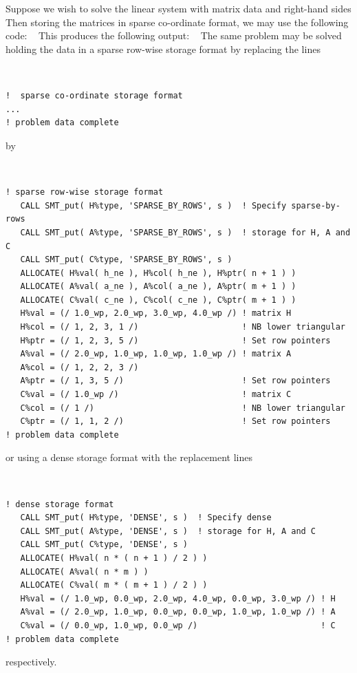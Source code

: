 \documentclass{galahad}
\newcommand{\package}{ssls}
\begin{document}
\galexample
Suppose we wish to solve the linear system  with matrix data
and right-hand sides
Then storing the matrices in sparse co-ordinate format,
we may use the following code:
{\tt \small
\VerbatimInput{\packageexample}
}
\noindent
This produces the following output:
{\tt \small
\VerbatimInput{\packageresults}
}
\noindent
The same problem may be solved holding the data in
a sparse row-wise storage format by replacing the lines
{\tt \small
\begin{verbatim}
!  sparse co-ordinate storage format
...
! problem data complete
\end{verbatim}
}
\noindent
by
{\tt \small
\begin{verbatim}
! sparse row-wise storage format
   CALL SMT_put( H%type, 'SPARSE_BY_ROWS', s )  ! Specify sparse-by-rows
   CALL SMT_put( A%type, 'SPARSE_BY_ROWS', s )  ! storage for H, A and C
   CALL SMT_put( C%type, 'SPARSE_BY_ROWS', s )
   ALLOCATE( H%val( h_ne ), H%col( h_ne ), H%ptr( n + 1 ) )
   ALLOCATE( A%val( a_ne ), A%col( a_ne ), A%ptr( m + 1 ) )
   ALLOCATE( C%val( c_ne ), C%col( c_ne ), C%ptr( m + 1 ) )
   H%val = (/ 1.0_wp, 2.0_wp, 3.0_wp, 4.0_wp /) ! matrix H
   H%col = (/ 1, 2, 3, 1 /)                     ! NB lower triangular
   H%ptr = (/ 1, 2, 3, 5 /)                     ! Set row pointers
   A%val = (/ 2.0_wp, 1.0_wp, 1.0_wp, 1.0_wp /) ! matrix A
   A%col = (/ 1, 2, 2, 3 /)
   A%ptr = (/ 1, 3, 5 /)                        ! Set row pointers
   C%val = (/ 1.0_wp /)                         ! matrix C
   C%col = (/ 1 /)                              ! NB lower triangular
   C%ptr = (/ 1, 1, 2 /)                        ! Set row pointers
! problem data complete
\end{verbatim}
}
\noindent
or using a dense storage format with the replacement lines
{\tt \small
\begin{verbatim}
! dense storage format
   CALL SMT_put( H%type, 'DENSE', s )  ! Specify dense
   CALL SMT_put( A%type, 'DENSE', s )  ! storage for H, A and C
   CALL SMT_put( C%type, 'DENSE', s )
   ALLOCATE( H%val( n * ( n + 1 ) / 2 ) )
   ALLOCATE( A%val( n * m ) )
   ALLOCATE( C%val( m * ( m + 1 ) / 2 ) )
   H%val = (/ 1.0_wp, 0.0_wp, 2.0_wp, 4.0_wp, 0.0_wp, 3.0_wp /) ! H
   A%val = (/ 2.0_wp, 1.0_wp, 0.0_wp, 0.0_wp, 1.0_wp, 1.0_wp /) ! A
   C%val = (/ 0.0_wp, 1.0_wp, 0.0_wp /)                         ! C
! problem data complete
\end{verbatim}
}
\noindent
respectively.
\end{document}

